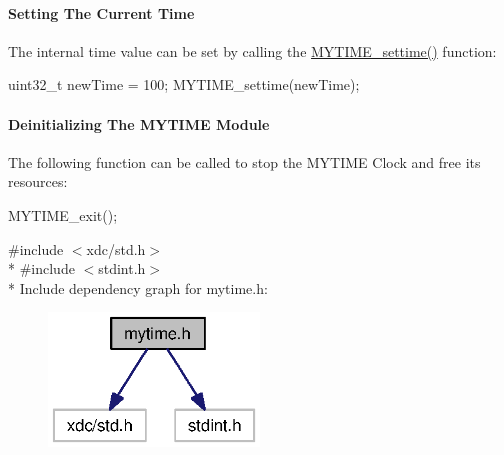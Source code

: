 \paragraph*{Setting The Current Time}

The internal time value can be set by calling the \hyperlink{mytime_8h_a0f77aa4bc459ff00050636b47cda79d3}{M\+Y\+T\+I\+M\+E\+\_\+settime()} function\+: 
\begin{DoxyCode}
uint32\_t newTime = 100;
MYTIME_settime(newTime);
\end{DoxyCode}


\paragraph*{Deinitializing The M\+Y\+T\+I\+M\+E Module}

The following function can be called to stop the M\+Y\+T\+I\+M\+E Clock and free its resources\+: 
\begin{DoxyCode}
MYTIME_exit();
\end{DoxyCode}
 

{\ttfamily \#include $<$xdc/std.\+h$>$}\\*
{\ttfamily \#include $<$stdint.\+h$>$}\\*
Include dependency graph for mytime.\+h\+:
\nopagebreak
\begin{figure}[H]
\begin{center}
\leavevmode
\includegraphics[width=159pt]{mytime_8h__incl}
\end{center}
\end{figure}
